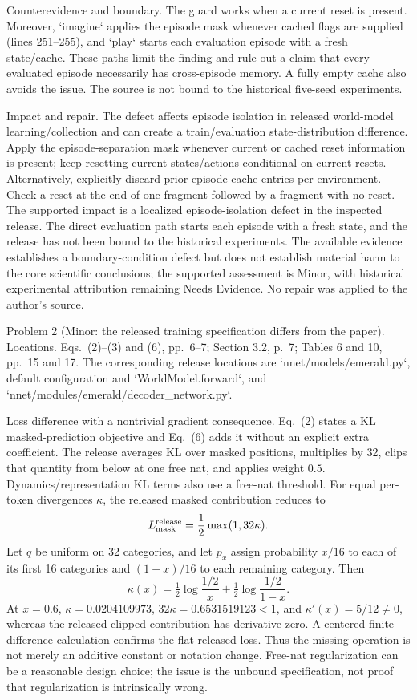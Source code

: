 \documentclass[10pt]{article}
\begin{document}
Counterevidence and boundary. The guard works when a current reset is present. Moreover, `imagine` applies the episode mask whenever cached flags are supplied (lines 251–255), and `play` starts each evaluation episode with a fresh state/cache. These paths limit the finding and rule out a claim that every evaluated episode necessarily has cross-episode memory. A fully empty cache also avoids the issue. The source is not bound to the historical five-seed experiments.\par
Impact and repair. The defect affects episode isolation in released world-model learning/collection and can create a train/evaluation state-distribution difference. Apply the episode-separation mask whenever current or cached reset information is present; keep resetting current states/actions conditional on current resets. Alternatively, explicitly discard prior-episode cache entries per environment. Check a reset at the end of one fragment followed by a fragment with no reset. The supported impact is a localized episode-isolation defect in the inspected release. The direct evaluation path starts each episode with a fresh state, and the release has not been bound to the historical experiments. The available evidence establishes a boundary-condition defect but does not establish material harm to the core scientific conclusions; the supported assessment is Minor, with historical experimental attribution remaining Needs Evidence. No repair was applied to the author’s source.\par
Problem 2 (Minor: the released training specification differs from the paper).  Locations. Eqs. (2)–(3) and (6), pp. 6–7; Section 3.2, p. 7; Tables 6 and 10, pp. 15 and 17. The corresponding release locations are `nnet/models/emerald.py`, default configuration and `WorldModel.forward`, and `nnet/modules/emerald/decoder\_network.py`.\par
Loss difference with a nontrivial gradient consequence. Eq. (2) states a KL masked-prediction objective and Eq. (6) adds it without an explicit extra coefficient. The release averages KL over masked positions, multiplies by 32, clips that quantity from below at one free nat, and applies weight \(0.5\). Dynamics/representation KL terms also use a free-nat threshold. For equal per-token divergences \(\kappa\), the released masked contribution reduces to \[L_{\rm mask}^{\rm release}=\frac12\max(1,32\kappa).\] Let \(q\) be uniform on 32 categories, and let \(p_x\) assign probability \(x/16\) to each of its first 16 categories and \((1-x)/16\) to each remaining category. Then \[\kappa(x)=\tfrac12\log\frac{1/2}{x}
           +\tfrac12\log\frac{1/2}{1-x}.\] At \(x=0.6\), \(\kappa=0.0204109973\), \(32\kappa=0.6531519123<1\), and \(\kappa'(x)=5/12\neq0\), whereas the released clipped contribution has derivative zero. A centered finite-difference calculation confirms the flat released loss. Thus the missing operation is not merely an additive constant or notation change. Free-nat regularization can be a reasonable design choice; the issue is the unbound specification, not proof that regularization is intrinsically wrong.\par
\end{document}
